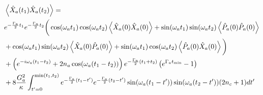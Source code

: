 \documentclass[12pt]{article}
\begin{document}
\begin{align}
&\Braket{\hat{X}_a(t_1)\hat{X}_a(t_2)} = \\
&e^{-\frac{\Gamma_a}{2} t_1}e^{-\frac{\Gamma_a}{2} t_2}\bigg(\cos(\omega_a t_1)\cos(\omega_a t_2)\Braket{\hat{X}_a(0)\hat{X}_a(0)} + \sin(\omega_a t_1)\sin(\omega_a t_2)\Braket{\hat{P}_a(0)\hat{P}_a(0)}\\
&+ \cos(\omega_a t_1)\sin(\omega_a t_2)\Braket{\hat{X}_a(0)\hat{P}_a(0)} + \sin(\omega_a t_1)\cos(\omega_a t_2)\Braket{\hat{P}_a(0)\hat{X}_a(0)} \bigg)\\
&+ \left(e^{-i\omega_a(t_1-t_2)} + 2n_a \cos(\omega_a(t_1-t_2))\right)e^{-\frac{\Gamma_a}{2}(t_1+t_2)}\left(e^{\Gamma_a t_{\text{min}}} - 1\right)\\
& + 8 \frac{G_a^2}{\kappa} \int_{t'=0}^{\text{min}(t_1,t_2)} e^{-\frac{\Gamma_a}{2}(t_1-t')}e^{-\frac{\Gamma_a}{2}(t_2-t')}\sin(\omega_a(t_1-t'))\sin(\omega_a(t_2-t'))(2n_c+1) dt'
\end{align}
\end{document}
